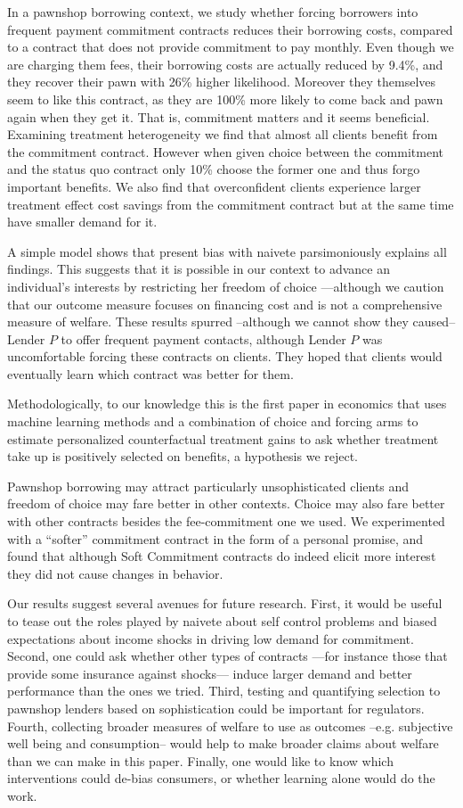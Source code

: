 \documentclass[oneside,11pt]{article}
\begin{document}
In a pawnshop borrowing context, we study whether forcing borrowers into frequent payment commitment contracts reduces their borrowing costs, compared to a contract that does not provide commitment to pay monthly. Even though we are charging them fees, their borrowing costs are actually reduced by 9.4\%, and they recover their pawn with 26\% higher likelihood. Moreover they themselves seem to like this contract, as they are 100\% more likely to come back and pawn again when they get it. That is, commitment matters and it seems beneficial. Examining treatment heterogeneity we find that almost all clients benefit from the commitment contract. However when given choice between the commitment and the status quo contract only 10\% choose the former one and thus forgo important benefits. We also find that overconfident clients experience larger treatment effect cost savings from the commitment contract but at the same time have smaller demand for it. 

A simple model shows that present bias with naivete parsimoniously explains all findings. This suggests that it is possible in our context to advance an individual's interests by restricting her freedom of choice ---although we caution that our outcome measure focuses on financing cost and is not a comprehensive measure of welfare. These results spurred --although we cannot show they caused-- Lender $P$ to offer frequent payment contacts, although Lender $P$ was uncomfortable forcing these contracts on clients. They hoped that clients would eventually learn which contract was better for them.

Methodologically, to our knowledge this is the first paper in economics that uses machine learning methods and a combination of choice and forcing arms to estimate personalized counterfactual treatment gains to ask whether treatment take up is positively selected on benefits, a hypothesis we reject.

Pawnshop borrowing may attract particularly unsophisticated clients and freedom of choice may fare better in other contexts. Choice may also fare better with other contracts besides the fee-commitment one we used. We experimented with a ``softer'' commitment contract in the form of a personal promise, and found that although Soft Commitment contracts do indeed elicit more interest they did not cause changes in behavior. 

Our results suggest several avenues for future research. First, it would be useful to tease out the roles played by naivete about self control problems and biased expectations about income shocks in driving low demand for commitment. Second, one could ask whether other types of contracts ---for instance those that provide some insurance against shocks---  induce larger demand and better performance than the ones we tried. Third, testing and quantifying selection to pawnshop lenders based on sophistication could be important for regulators. Fourth, collecting broader measures of welfare to use as outcomes --e.g. subjective well being and consumption-- would help to make broader claims about welfare than we can make in this paper. Finally, one would like to know which interventions could de-bias consumers, or whether learning alone would do the work.
\end{document}
